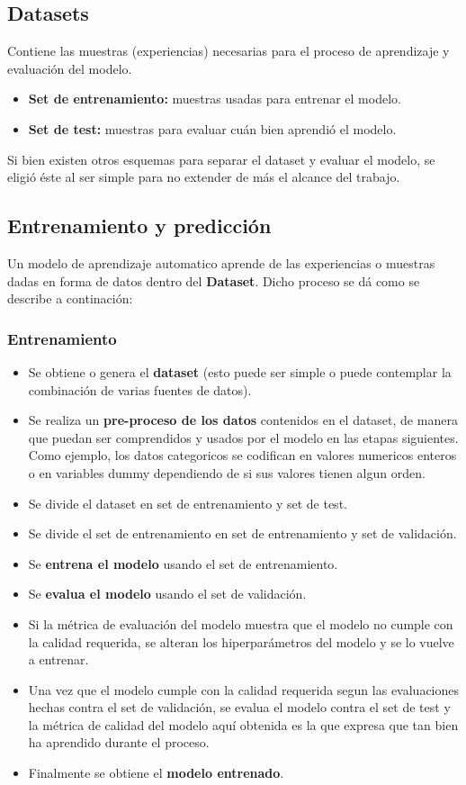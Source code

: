 \documentclass[
11pt, %
oneside, %
spanish, %
singlespacing, %
parskip, %
headsepline, %
chapterinoneline, %
]{MastersDoctoralThesis} %
\begin{document}
\subsection{Datasets}
Contiene las muestras (experiencias) necesarias para el proceso de aprendizaje y evaluación del modelo.
\begin{itemize}
\item \textbf{Set de entrenamiento:} muestras usadas para entrenar el modelo.
\item \textbf{Set de test:} muestras para evaluar cuán bien aprendió el modelo.
\end{itemize}

Si bien existen otros esquemas para separar el dataset y evaluar el modelo, se eligió éste al ser simple para no extender de más el alcance del trabajo.

\subsection{Entrenamiento y predicción}

Un modelo de aprendizaje automatico aprende de las experiencias o muestras dadas en forma de datos dentro del \textbf{Dataset}. Dicho proceso se dá como se describe a continación:

\subsubsection*{Entrenamiento}
\begin{itemize}
\item Se obtiene o genera el \textbf{dataset} (esto puede ser simple o puede contemplar la combinación de varias fuentes de datos).
\item Se realiza un \textbf{pre-proceso de los datos} contenidos en el dataset, de manera que puedan ser comprendidos y usados por el modelo en las etapas siguientes. Como ejemplo, los datos categoricos se codifican en valores numericos enteros o en variables dummy dependiendo de si sus valores tienen algun orden. 
\item Se divide el dataset en set de entrenamiento y set de test.
\item Se divide el set de entrenamiento en set de entrenamiento y set de validación.
\item Se \textbf{entrena el modelo} usando el set de entrenamiento.
\item Se \textbf{evalua el modelo} usando el set de validación.
\item Si la métrica de evaluación del modelo muestra que el modelo no cumple con la calidad requerida, se alteran los hiperparámetros del modelo y se lo vuelve a entrenar. 
\item Una vez que el modelo cumple con la calidad requerida segun las evaluaciones hechas contra el set de validación, se evalua el modelo contra el set de test y la métrica de calidad del modelo aquí obtenida es la que expresa que tan bien ha aprendido durante el proceso.
\item  Finalmente se obtiene el \textbf{modelo entrenado}.
\end{itemize}
\end{document}
